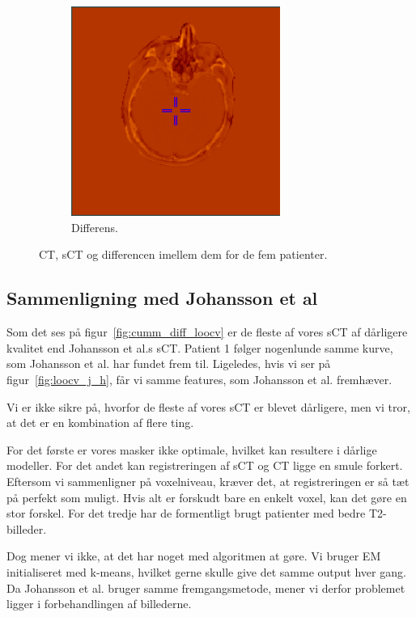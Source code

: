 \begin{figure}
\begin{subfigure}[b]{0.3\textwidth}
        \includegraphics[width=0.75\textwidth]{colager/loocv_ct/loocv_011030_sub.png}
        \caption{Differens.}
        \label{col:loocv_ct_pat5_sub}
    \end{subfigure}
    \caption{CT, sCT og differencen imellem dem for de fem patienter.}
    \label{col:loocv_ct}
\end{figure}

\subsection{Sammenligning med Johansson et al}


Som det ses på figur~\ref{fig:cumm_diff_loocv} er de fleste af vores sCT af dårligere kvalitet end Johansson et al.s sCT. Patient 1 følger nogenlunde samme kurve, som Johansson et al. har fundet frem til. Ligeledes, hvis vi ser på figur~\ref{fig:loocv_j_h}, får vi samme features, som Johansson et al. fremhæver.

Vi er ikke sikre på, hvorfor de fleste af vores sCT er blevet dårligere, men vi tror, at det er en kombination af flere ting. 

For det første er vores masker ikke optimale, hvilket kan resultere i dårlige modeller. For det andet kan registreringen af sCT og CT ligge en smule forkert. Eftersom vi sammenligner på voxelniveau, kræver det, at registreringen er så tæt på perfekt som muligt. Hvis alt er forskudt bare en enkelt voxel, kan det gøre en stor forskel. For det tredje har de formentligt brugt patienter med bedre T2-billeder.

Dog mener vi ikke, at det har noget med algoritmen at gøre. Vi bruger EM initialiseret med k-means, hvilket gerne skulle give det samme output hver gang. Da Johansson et al. bruger samme fremgangsmetode, mener vi derfor problemet ligger i forbehandlingen af billederne.


